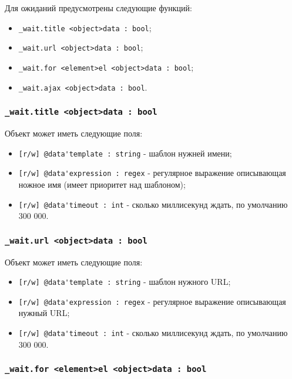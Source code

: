 \documentclass[a4paper, 14pt]{extarticle}
\newenvironment{icItems}
	{ \begin{itemize} [noitemsep,nolistsep] }
	{ \end{itemize} }
\begin{document}
Для ожиданий предусмотрены следующие функций:
\begin{icItems}
	\item \lstinline|_wait.title <object>data : bool|;
	\item \lstinline|_wait.url <object>data : bool|;
	\item \lstinline|_wait.for <element>el <object>data : bool|;
	\item \lstinline|_wait.ajax <object>data : bool|.
\end{icItems}

\subsubsection{\lstinline|_wait.title <object>data : bool|}

Объект  может иметь следующие поля:
\begin{icItems}
	\item \lstinline|[r/w] @data'template : string| - шаблон нужней имени;
	\item \lstinline|[r/w] @data'expression : regex| - регулярное выражение описывающая ножное имя (имеет приоритет над шаблоном);
	\item \lstinline|[r/w] @data'timeout : int| - сколько миллисекунд ждать, по умолчанию 300 000.
\end{icItems}

\subsubsection{\lstinline|_wait.url <object>data : bool|}

Объект  может иметь следующие поля:
\begin{icItems}
	\item \lstinline|[r/w] @data'template : string| - шаблон нужного URL;
	\item \lstinline|[r/w] @data'expression : regex| - регулярное выражение описывающая нужный URL;
	\item \lstinline|[r/w] @data'timeout : int| - сколько миллисекунд ждать, по умолчанию 300 000.
\end{icItems}

\subsubsection{\lstinline|_wait.for <element>el <object>data : bool|}
\end{document}
